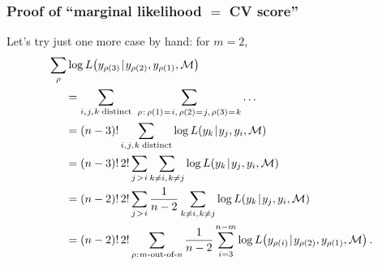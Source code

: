 \documentclass[18pt]{beamer}
\newcommand{\defineTightSpacing}{%
	\setlength{\abovedisplayskip}{.25\baselineskip}%
	\setlength{\belowdisplayskip}{.25\baselineskip}%
}
\newcommand{\given}{\thinnerspace | \thinnerspace}
\newcommand{\spacedColon}{\mkern .5mu : \mkern 1mu}
\newcommand{\spacedEq}{\mkern 1mu = \mkern 1.5mu}
\newcommand{\thinnerspace}{\mskip.5\thinmuskip}
\newcommand{\likelihood}{L}
\newcommand{\modelSymbol}{\mathcal{M}}
\newcommand{\permutation}{\rho}
\newcommand{\trainingSize}{m}
\newcommand{\testSampleIndex}{i}
\begin{document}
\begin{frame}
\frametitle{Proof of ``marginal likelihood $=$ {\large CV} score''}
Let's try just one more case by hand: for $m = 2$,  
\begin{equation*} %
\begin{aligned}
&\sum_\permutation \log \likelihood\!\left(y_{\permutation(3)} \given y_{\permutation(2)}, y_{\permutation(1)}, \modelSymbol \right) \\
	&\hspace*{1.5em}= \sum_{\testSampleIndex, \thinnerspace j, \thinnerspace k \mkern 5mu \mathrm{distinct}} \ 
	\sum_{\permutation \thinnerspace : \, \permutation(1) \spacedEq i, \, \permutation(2) \spacedEq j, \, \permutation(3) \spacedEq k} \ldots \\
	&\hspace*{1.5em}= (n - 3)! \sum_{\testSampleIndex, \thinnerspace j, \thinnerspace k \mkern 5mu \mathrm{distinct}} \log \likelihood\!\left(y_k \given y_j, y_\testSampleIndex, \modelSymbol \right) \\
	&\hspace*{1.5em}= (n - 3)! \, 2! \sum_{j \thinnerspace > \thinnerspace \testSampleIndex} \sum_{k \neq \testSampleIndex, \thinnerspace k \neq j} \log \likelihood\!\left(y_k \given y_j, y_\testSampleIndex, \modelSymbol \right) \\
	&\hspace*{1.5em}= (n - 2)! \, 2! \sum_{j \thinnerspace > \thinnerspace \testSampleIndex} 
		\frac{1}{n - 2}\sum_{k \neq \testSampleIndex, \thinnerspace k \neq j} \log \likelihood\!\left(y_k \given y_j, y_\testSampleIndex, \modelSymbol \right) \\
	&\hspace*{1.5em}= (n - 2)! \, 2! \sum_{\permutation \spacedColon \text{$\trainingSize$-out-of-$n$}}
		\frac{1}{n - 2} \sum_{\testSampleIndex = 3}^{n - \trainingSize} \log \likelihood\!\left(y_{\permutation(\testSampleIndex)} \given y_{\permutation(2)}, y_{\permutation(1)}, \modelSymbol \right).
\end{aligned}
\end{equation*}
\end{frame}
\end{document}
